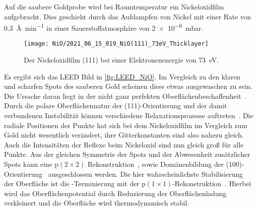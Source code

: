         Auf die saubere Goldprobe wird bei Raumtemperatur ein Nickeloxidfilm aufgebracht.
        Dies geschieht durch das Aufdampfen von Nickel mit einer Rate von \SI{0.3}{\angstrom\per\minute} in einer Sauerstoffatmosphäre von \SI{2e-6}{\milli\bar}.
        \begin{figure}
            \centering
            \texttt{[image: NiO/2021\_06\_15\_019\_NiO(111)\_73eV\_Thicklayer]}
            \caption{Der Nickeloxidfilm (111) bei einer Elektronenenergie von \SI{73}{\electronvolt}.}
            \label{fig:LEED_NiO}
        \end{figure}
        Es ergibt sich das LEED Bild in \autoref{fig:LEED_NiO}.
        Im Vergleich zu den klaren und scharfen Spots des sauberen Gold scheinen diese etwas ausgewaschen zu sein.
        Die Ursache daran liegt in der nicht ganz perfekten Oberflächenbeschaffenheit~\cite{NiO_34}.
        Durch die polare Oberflächennatur der (111)-Orientierung und der damit verbundenen Instabilität können verschiedene Relaxationsprozesse auftreten~\cite{NiO_36, NiO_35, NiO_34, NiO_27, NiO_10}.
        Die radiale Positionen der Punkte hat sich bei dem Nickeloxidfilm im Vergleich zum Gold nicht wesentlich verändert, ihre Gitterkonstanten sind also nahezu gleich.
        Auch die Intensitäten der Reflexe beim Nickeloxid sind nun gleich groß für alle Punkte.
        Aus der gleichen Symmetrie der Spots und der Abwesenheit zusätzlicher Spots kann eine $\text{p}(2 \times 2)$ Rekonstruktion~\cite{NiO_37}, sowie Domänenbildung der (100)-Orientierung~\cite{NiO_36} ausgeschlossen werden.
        Die hier wahrscheinlichste Stabilisierung der Oberfläche ist die -Terminierung mit der $\text{p}(1 \times 1)$-Rekonstruktion~\cite{NiO_35}.
        Hierbei wird das Oberflächenpotential durch Reduzierung der Oberflächenladung verkleinert und die Oberfläche wird thermodynamisch stabil.

